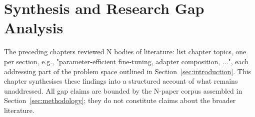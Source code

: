 \section{Synthesis and Research Gap Analysis}
\label{sec:synthesis_gap}

The preceding chapters reviewed N bodies of literature: list chapter topics,
one per section, e.g., "parameter-efficient fine-tuning, adapter composition,
...", each addressing part of the problem space outlined in
Section~\ref{sec:introduction}. This chapter synthesises these findings into a
structured account of what remains unaddressed. All gap claims are bounded by
the N-paper corpus assembled in Section~\ref{sec:methodology}; they do not
constitute claims about the broader literature.
